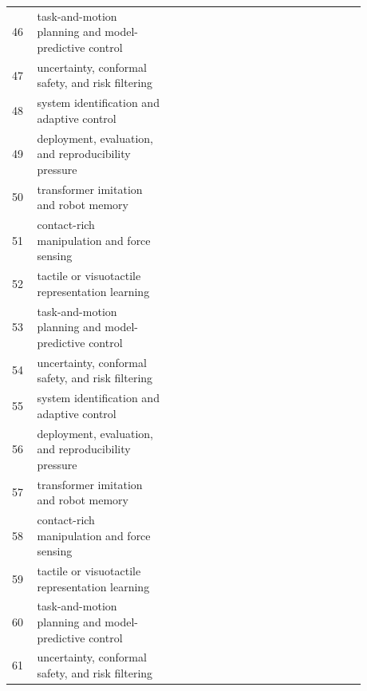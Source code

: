 \documentclass{article}
\begin{document}
\begin{longtable}{p{0.06\linewidth}p{0.34\linewidth}p{0.48\linewidth}}
46 & task-and-motion planning and model-predictive control & \citep{li2024evcap136,wu2021a137,brainin2021robot138} \\
47 & uncertainty, conformal safety, and risk filtering & \citep{francani2025transformerbased139,zhu2022parallel140,liu2023unified141} \\
48 & system identification and adaptive control & \citep{guo2019a142,qian2023scene143,giuliari2020transformer144} \\
49 & deployment, evaluation, and reproducibility pressure & \citep{brack2023atman145,he2025multimodal146,wang2023memoryandanticipation147} \\
50 & transformer imitation and robot memory & \citep{li2022graphbased148,lou2022unsupervised149,wang2021sceneformer150} \\
51 & contact-rich manipulation and force sensing & \citep{xu2024image151,chen2024visual152,ahn2023robotic153} \\
52 & tactile or visuotactile representation learning & \citep{wang2021structured154,zhang2023a155,sarkar2023edgemoe156} \\
53 & task-and-motion planning and model-predictive control & \citep{mathur2023proactive157,lai2022a158,gao2025degradationaware159} \\
54 & uncertainty, conformal safety, and risk filtering & \citep{xia2020multiplex160,wu2024swformervo161,pu2024spatialtemporal162} \\
55 & system identification and adaptive control & \citep{gao2024siftf163,wu2022pale164,yang2023memoryefficient165} \\
56 & deployment, evaluation, and reproducibility pressure & \citep{liu2023enhanced166,yang2024defort167,zhang2023learning168} \\
57 & transformer imitation and robot memory & \citep{wang2023vlsat169,ravichandran2022hierarchical170,kim2024audiovisual171} \\
58 & contact-rich manipulation and force sensing & \citep{tang2024outdoor172,bian2022engineering173,jin2025a174} \\
59 & tactile or visuotactile representation learning & \citep{xiong2024context175,lu2021contextaware176,yang2021a177} \\
60 & task-and-motion planning and model-predictive control & \citep{mohanrajan2022novel178,kamoona2025online179,wang2025cwctransformer180} \\
61 & uncertainty, conformal safety, and risk filtering & \citep{park2025visual181,roy2024interaction182,ran2021scene183} \\

\end{longtable}
\end{document}
